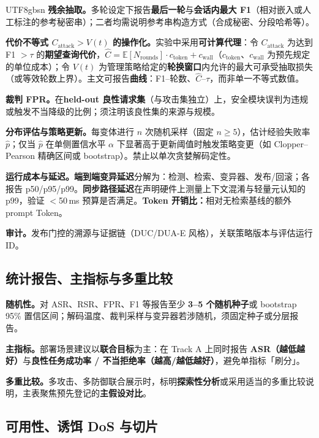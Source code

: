 \documentclass[letterpaper,twocolumn,10pt]{article}
\begin{document}
\begin{CJK}{UTF8}{gbsn}
\textbf{残余抽取。}多轮设定下报告\textbf{最后一轮}与\textbf{会话内最大 F1}（相对嵌入或人工标注的参考秘密串）；二者均需说明参考串构造方式（合成秘密、分段哈希等）。

\textbf{代价不等式 $C_{\mathrm{attack}} > V(t)$ 的操作化。}实验中采用\textbf{可计算代理}：令 $C_{\mathrm{attack}}$ 为达到 F1 $>\tau$ 的\textbf{期望查询代价}，$\hat{C} = \mathbb{E}[N_{\mathrm{rounds}}] \cdot c_{\mathrm{token}} + c_{\mathrm{wall}}$（$c_{\mathrm{token}}$、$c_{\mathrm{wall}}$ 为预先规定的单位成本）；令 $V(t)$ 为管理策略给定的\textbf{轮换窗口}内允许的最大可承受抽取损失（或等效轮数上界）。主文可报告\textbf{曲线}：F1--轮数、$\hat{C}$--$\tau$，而非单一不等式数值。

\textbf{裁判 FPR。}在\textbf{held-out 良性请求集}（与攻击集独立）上，安全模块误判为违规或触发不当降级的比例；须注明该良性集的来源与规模。

\textbf{分布评估与策略更新。}每变体进行 $n$ 次随机采样（固定 $n\ge 5$），估计经验失败率 $\hat{p}$；仅当 $\hat{p}$ 在单侧置信水平 $\alpha$ 下显著高于更新阈值时触发策略变更（如 Clopper--Pearson 精确区间或 bootstrap）。禁止以单次贪婪解码定性。

\textbf{运行成本与延迟。}\textbf{端到端变异延迟}分解为：检测、检索、变异器、发布/回滚；各报告 p50/p95/p99。\textbf{同步路径延迟}在声明硬件上测量上下文混淆与轻量元认知的 p99，验证 $<$50\,ms 预算是否满足。\textbf{Token 开销比：}相对无检索基线的额外 prompt Token。

\textbf{审计。}发布门控的溯源与证据链（DUC/DUA-E 风格），关联策略版本与评估运行 ID。

\subsection{统计报告、主指标与多重比较}
\label{sec:eval-stats}

\textbf{随机性。}对 ASR、RSR、FPR、F1 等报告至少 \textbf{3--5 个随机种子}或 bootstrap 95\% 置信区间；解码温度、裁判采样与变异器若涉随机，须固定种子或分层报告。

\textbf{主指标。}部署场景建议以\textbf{联合目标}为主：在 Track A 上同时报告 \textbf{ASR（越低越好）}与\textbf{良性任务成功率 / 不当拒绝率（越高/越低越好）}，避免单指标「刷分」。

\textbf{多重比较。}多攻击、多防御联合展示时，标明\textbf{探索性分析}或采用适当的多重比较说明，主表聚焦预先登记的\textbf{主假设对比}。

\subsection{可用性、诱饵 DoS 与切片}
\label{sec:eval-utility}


\end{CJK}
\end{document}
